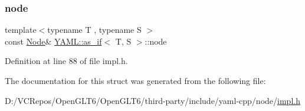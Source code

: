 \subsubsection{\texorpdfstring{node}{node}}
{\footnotesize\ttfamily template$<$typename T , typename S $>$ \\
const \mbox{\hyperlink{class_y_a_m_l_1_1_node}{Node}}\& \mbox{\hyperlink{struct_y_a_m_l_1_1as__if}{Y\+A\+M\+L\+::as\+\_\+if}}$<$ T, S $>$\+::node}



Definition at line 88 of file impl.\+h.



The documentation for this struct was generated from the following file\+:\begin{DoxyCompactItemize}
\item 
D\+:/\+V\+C\+Repos/\+Open\+G\+L\+T6/\+Open\+G\+L\+T6/third-\/party/include/yaml-\/cpp/node/\mbox{\hyperlink{impl_8h}{impl.\+h}}\end{DoxyCompactItemize}
